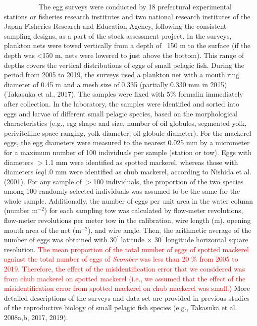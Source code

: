 \documentclass[12pt]{article}
\begin{document}
\begin{linenumbers}
{\ \ \ \ \ \ \ \ \ \
The egg surveys were conducted by 18 prefectural experimental stations or fisheries research institutes and two national research institutes of the Japan Fisheries Research and Education Agency, following the consistent sampling designs, as a part of the stock assessment project. In the surveys, plankton nets were towed vertically from a depth of ~150 m to the surface (if the depth was <150 m, nets were lowered to just above the bottom). This range of depths covers the vertical distributions of eggs of small pelagic fish. During the period from 2005 to 2019, the surveys used a plankton net with a mouth ring diameter of 0.45 m and a mesh size of 0.335 (partially 0.330 mm in 2015) (Takasuka et al., 2017). The samples were fixed with 5\% formalin immediately after collection. In the laboratory, the samples were identified and sorted into eggs and larvae of different small pelagic species, based on the morphological characteristics (e.g., egg shape and size, number of oil globules, segmented yolk, perivitelline space ranging, yolk diameter, oil globule diameter). For the mackerel eggs, the egg diameters were measured to the nearest 0.025 mm by a micrometer for a maximum number of 100 individuals per sample (station or tow). Eggs with diameters $>$1.1 mm were identified as spotted mackerel, whereas those with diameters $leq$1.0 mm were identified as chub mackerel, according to Nishida et al. (2001). For any sample of $>$100 individuals, the proportion of the two species among 100 randomly selected individuals was assumed to be the same for the whole sample. Additionally, the number of eggs per unit area in the water column (number $\mathrm{m^{-2}}$) for each sampling tow was calculated by flow-meter revolutions, flow-meter revolutions per meter tow in the calibration, wire length (m), opening mouth area of the net  ($\mathrm{m^{-2}}$), and wire angle. Then, the arithmetic average of the number of eggs was obtained with $\textrm{30}^\prime$ latitude $\times$ $\textrm{30}^\prime$ longitude horizontal square resolution.
\textcolor{red}{The mean proportion of the total number of eggs of spotted mackerel against the total number of eggs of \textit{Scomber} was less than 20 \% from 2005 to 2019. Therefore, the effect of the misidentification error that we considered was from chub mackerel on spotted mackerel (i.e., we assumed that the effect of the misidentification error from spotted  mackerel on chub mackerel was small.)} More detailed descriptions of the surveys and data set are provided in previous studies of the reproductive biology of small pelagic fish species (e.g., Takasuka et al. 2008a,b, 2017, 2019).

}
\end{linenumbers}
\end{document}
